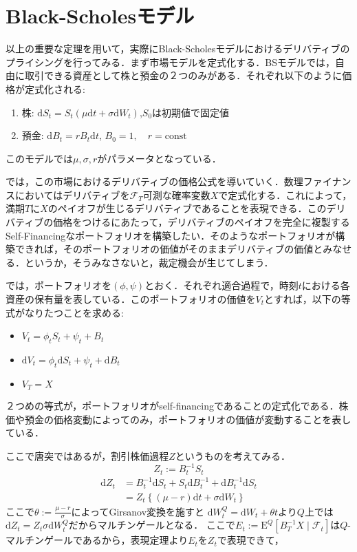 \documentclass{jsarticle}
\theoremstyle{definition}
\begin{document}
\section{Black-Scholesモデル}
以上の重要な定理を用いて，実際にBlack-Scholesモデルにおけるデリバティブのプライシングを行ってみる．まず市場モデルを定式化する．BSモデルでは，自由に取引できる資産として株と預金の２つのみがある．それぞれ以下のように価格が定式化される:
\begin{enumerate}
    \item 株: $\mathrm{d}S_t = S_t (\mu \mathrm{d}t + \sigma\mathrm{d}W_t)$,\quad $S_0$は初期値で固定値
    \item 預金: $\mathrm{d}B_t = rB_t\mathrm{d}t$, $B_0 = 1,\quad r = \text{const}$
\end{enumerate}
このモデルでは$\mu, \sigma, r$がパラメータとなっている．

では，この市場におけるデリバティブの価格公式を導いていく．数理ファイナンスにおいてはデリバティブを$\mathscr{F}_T$可測な確率変数$X$で定式化する．これによって，満期$T$に$X$のペイオフが生じるデリバティブであることを表現できる．このデリバティブの価格をつけるにあたって，デリバティブのペイオフを完全に複製するSelf-Financingなポートフォリオを構築したい．そのようなポートフォリオが構築できれば，そのポートフォリオの価値がそのままデリバティブの価値とみなせる．というか，そうみなさないと，裁定機会が生じてしまう．

では，ポートフォリオを$(\phi, \psi)$とおく．それぞれ適合過程で，時刻$t$における各資産の保有量を表している．このポートフォリオの価値を$V_t$とすれば，以下の等式がなりたつことを求める:
\begin{itemize}
    \item $V_t = \phi_t S_t + \psi_t + B_t$
    \item $\mathrm{d}V_t = \phi_t \mathrm{d}S_t + \psi_t + \mathrm{d}B_t$
    \item $V_T = X$
\end{itemize}
２つめの等式が，ポートフォリオがself-financingであることの定式化である．株価や預金の価格変動によってのみ，ポートフォリオの価値が変動することを表している．

ここで唐突ではあるが，割引株価過程$Z$というものを考えてみる．
\begin{equation*}
    Z_t := B_t^{-1} S_t
\end{equation*}
\begin{align*}
    \mathrm{d}Z_t &= B_t^{-1}\mathrm{d}S_t + S_t\mathrm{d}B_t^{-1} + \mathrm{d}B_t^{-1}\mathrm{d}S_t\\
    &= Z_t\left\{(\mu - r) \mathrm{d}t + \sigma \mathrm{d}W_t\right\}
\end{align*}
ここで$\theta := \frac{\mu - r}{\sigma}$によってGirsanov変換を施すと
$\mathrm{d}W^Q_t = \mathrm{d}W_t + \theta t$より$Q$上では$\mathrm{d}Z_t = Z_t\sigma \mathrm{d}W^Q_t$だからマルチンゲールとなる．
ここで$E_t := \mathrm{E}^Q\left[B_T^{-1} X \mid \mathscr{F}_t\right]$は$Q$-マルチンゲールであるから，表現定理より$E_t$を$Z_t$で表現できて，
\end{document}

